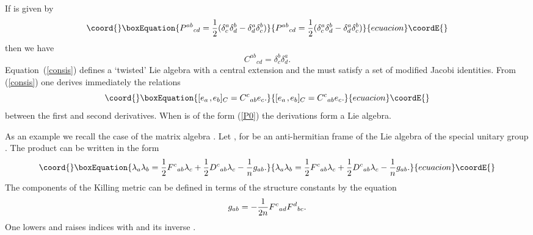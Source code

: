\documentclass[a4paper,12pt]{article}
\def\k{\kern-.1em\mathbin{,}\kern-.1em}
\begin{document}
If \coordHE{} is given by
\begin{equation}\coord{}\boxEquation{
P^{ab}{}_{cd} = {1 \over 2} (\delta^a_c \delta^b_d - \delta^a_d
\delta^b_c) \label{P0}
}{
P^{ab}{}_{cd} = {1 \over 2} (\delta^a_c \delta^b_d - \delta^a_d
\delta^b_c) }{ecuacion}\coordE{}\end{equation}
then we have
$$
C^{ab}{}_{cd} = \delta^b_c \delta^a_d.                          %
$$
Equation~(\ref{consis}) defines a `twisted' Lie algebra with a
central extension and the \coordHE{} must satisfy a set of modified
Jacobi identities.  From (\ref{consis}) one derives immediately the
relations
\begin{equation}\coord{}\boxEquation{
[e_a\k e_b]_C = C^c{}_{ab} e_c.  \label{Lie}
}{
[e_a\k e_b]_C = C^c{}_{ab} e_c.  }{ecuacion}\coordE{}\end{equation}
between the first and second derivatives. When \coordHE{} is of
the form (\ref{P0}) the derivations form a Lie algebra.

As an example we recall the case of the matrix algebra \coordHE{}.  Let
\coordHE{}, for \coordHE{} be an anti-hermitian frame of
the Lie algebra of the special unitary group \coordHE{}. The product
\coordHE{} can be written in the form
\begin{equation}\coord{}\boxEquation{
\lambda_a \lambda_b = {1\over 2} F^c{}_{ab} \lambda_c + {1\over 2}
D^c{}_{ab} \lambda_c - {1 \over n} g_{ab}.  \label{3.1.1}
}{
\lambda_a \lambda_b = {1\over 2} F^c{}_{ab} \lambda_c + {1\over 2}
D^c{}_{ab} \lambda_c - {1 \over n} g_{ab}.  }{ecuacion}\coordE{}\end{equation}
The components \coordHE{} of the Killing metric can be
defined in terms of the structure constants by the equation
$$
g_{ab} = - {1\over 2n}F^c{}_{ad}F^d{}_{bc}.                  %
$$
One lowers and raises indices with \coordHE{} and its inverse \coordHE{}. 
\end{document}
